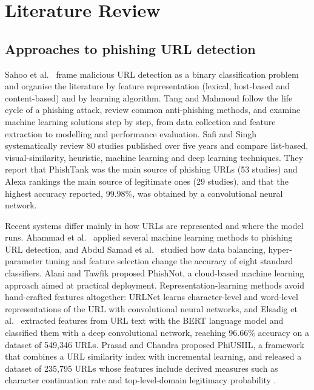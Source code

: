 \documentclass[pdflatex,sn-mathphys-num]{sn-jnl}%
\theoremstyle{thmstyleone}%
\theoremstyle{thmstyletwo}%
\theoremstyle{thmstylethree}%
\begin{document}
\section{Literature Review}\label{sec2}

\subsection{Approaches to phishing URL detection}\label{subsec2-1}

Sahoo et al.\ \cite{sahoo2017} frame malicious URL detection as a binary classification problem and organise the literature by feature representation (lexical, host-based and content-based) and by learning algorithm. Tang and Mahmoud \cite{tang2021} follow the life cycle of a phishing attack, review common anti-phishing methods, and examine machine learning solutions step by step, from data collection and feature extraction to modelling and performance evaluation. Safi and Singh \cite{safi2023} systematically review 80 studies published over five years and compare list-based, visual-similarity, heuristic, machine learning and deep learning techniques. They report that PhishTank was the main source of phishing URLs (53 studies) and Alexa rankings the main source of legitimate ones (29 studies), and that the highest accuracy reported, 99.98\%, was obtained by a convolutional neural network.

Recent systems differ mainly in how URLs are represented and where the model runs. Ahammad et al.\ \cite{ahammad2022} applied several machine learning methods to phishing URL detection, and Abdul Samad et al.\ \cite{abdulsamad2023} studied how data balancing, hyper-parameter tuning and feature selection change the accuracy of eight standard classifiers. Alani and Tawfik \cite{alani2022} proposed PhishNot, a cloud-based machine learning approach aimed at practical deployment. Representation-learning methods avoid hand-crafted features altogether: URLNet \cite{le2018} learns character-level and word-level representations of the URL with convolutional neural networks, and Elsadig et al.\ \cite{elsadig2022} extracted features from URL text with the BERT language model \cite{devlin2019} and classified them with a deep convolutional network, reaching 96.66\% accuracy on a dataset of 549,346 URLs. Prasad and Chandra \cite{prasad2024} proposed PhiUSIIL, a framework that combines a URL similarity index with incremental learning, and released a dataset of 235,795 URLs whose features include derived measures such as character continuation rate and top-level-domain legitimacy probability \cite{prasad2024data}.
\end{document}
